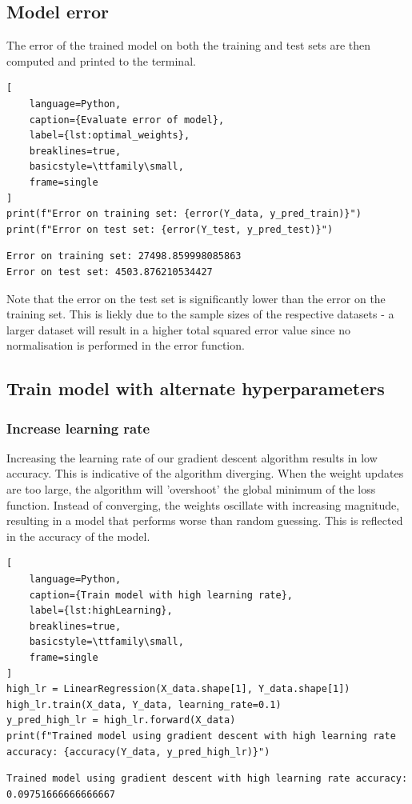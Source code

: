 \documentclass[11pt]{article}
\begin{document}
\subsection{Model error}
The error of the trained model on both the training and test sets are then computed and printed to the terminal.
\begin{lstlisting}[
    language=Python, 
    caption={Evaluate error of model},
    label={lst:optimal_weights},
    breaklines=true,
    basicstyle=\ttfamily\small,
    frame=single
]
print(f"Error on training set: {error(Y_data, y_pred_train)}")
print(f"Error on test set: {error(Y_test, y_pred_test)}")
\end{lstlisting}

\begin{lstlisting}[style=terminal, caption={Code execution output}]
Error on training set: 27498.859998085863
Error on test set: 4503.876210534427
\end{lstlisting}

Note that the error on the test set is significantly lower than the error on the training set. This is liekly due to the sample sizes of the respective datasets - a larger dataset will result in a higher total squared error value since no normalisation is performed in the error function.

\subsection{Train model with alternate hyperparameters}
\subsubsection{Increase learning rate}
Increasing the learning rate of our gradient descent algorithm results in low accuracy. This is indicative of the algorithm diverging. When the weight 
updates are too large, the algorithm will 'overshoot' the global minimum of the loss function. Instead of converging, the weights oscillate with increasing magnitude, resulting in a model that performs worse than random guessing. This is reflected in the accuracy of the model.
\begin{lstlisting}[
    language=Python, 
    caption={Train model with high learning rate},
    label={lst:highLearning},
    breaklines=true,
    basicstyle=\ttfamily\small,
    frame=single
]
high_lr = LinearRegression(X_data.shape[1], Y_data.shape[1])
high_lr.train(X_data, Y_data, learning_rate=0.1)
y_pred_high_lr = high_lr.forward(X_data)
print(f"Trained model using gradient descent with high learning rate accuracy: {accuracy(Y_data, y_pred_high_lr)}")
\end{lstlisting}
\begin{lstlisting}[style=terminal, caption={Code execution output}]
Trained model using gradient descent with high learning rate accuracy: 0.09751666666666667
\end{lstlisting}
\end{document}
